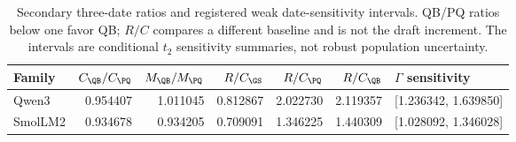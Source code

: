 \begin{table}[t]\centering\small
\caption{Secondary three-date ratios and registered weak date-sensitivity intervals. QB/PQ ratios below one favor QB; $R/C$ compares a different baseline and is not the draft increment. The intervals are conditional $t_2$ sensitivity summaries, not robust population uncertainty.}\label{tab:scopesecondary}
\begin{tabular}{@{}lrrrrrl@{}}\toprule
Family & $C_{\QB}/C_{\PQ}$ & $M_{\QB}/M_{\PQ}$ & $R/C_{\GS}$ & $R/C_{\PQ}$ & $R/C_{\QB}$ & $\Gamma$ sensitivity\\\midrule
Qwen3 & 0.954407 & 1.011045 & 0.812867 & 2.022730 & 2.119357 & [1.236342, 1.639850]\\
SmolLM2 & 0.934678 & 0.934205 & 0.709091 & 1.346225 & 1.440309 & [1.028092, 1.346028]\\
\bottomrule\end{tabular}
\end{table}
